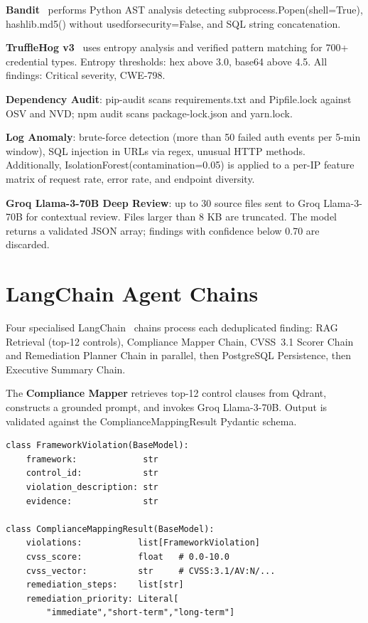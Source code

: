 \documentclass[conference]{IEEEtran}
\begin{document}
\textbf{Bandit}~\cite{bandit} performs Python AST analysis detecting
subprocess.Popen(shell=True), hashlib.md5() without usedforsecurity=False,
and SQL string concatenation.

\textbf{TruffleHog v3}~\cite{trufflehog} uses entropy analysis and
verified pattern matching for 700+ credential types. Entropy thresholds:
hex above 3.0, base64 above 4.5. All findings: Critical severity, CWE-798.

\textbf{Dependency Audit}: pip-audit scans requirements.txt and
Pipfile.lock against OSV and NVD; npm audit scans package-lock.json and
yarn.lock.

\textbf{Log Anomaly}: brute-force detection (more than 50 failed auth
events per 5-min window), SQL injection in URLs via regex, unusual HTTP
methods. Additionally, IsolationForest(contamination=0.05) is applied to
a per-IP feature matrix of request rate, error rate, and endpoint
diversity.

\textbf{Groq Llama-3-70B Deep Review}: up to 30 source files sent to
Groq Llama-3-70B for contextual review. Files larger than 8 KB are
truncated. The model returns a validated JSON array; findings with
confidence below 0.70 are discarded.

\section{LangChain Agent Chains}
\label{sec:agent}

Four specialised LangChain~\cite{langchain} chains process each
deduplicated finding: RAG Retrieval (top-12 controls), Compliance Mapper
Chain, CVSS~3.1 Scorer Chain and Remediation Planner Chain in parallel,
then PostgreSQL Persistence, then Executive Summary Chain.

The \textbf{Compliance Mapper} retrieves top-12 control clauses from
Qdrant, constructs a grounded prompt, and invokes Groq Llama-3-70B.
Output is validated against the ComplianceMappingResult Pydantic schema.

\begin{lstlisting}[style=pycode, caption={Compliance mapper schema.}]
class FrameworkViolation(BaseModel):
    framework:             str
    control_id:            str
    violation_description: str
    evidence:              str

class ComplianceMappingResult(BaseModel):
    violations:           list[FrameworkViolation]
    cvss_score:           float   # 0.0-10.0
    cvss_vector:          str     # CVSS:3.1/AV:N/...
    remediation_steps:    list[str]
    remediation_priority: Literal[
        "immediate","short-term","long-term"]
\end{lstlisting}
\end{document}
